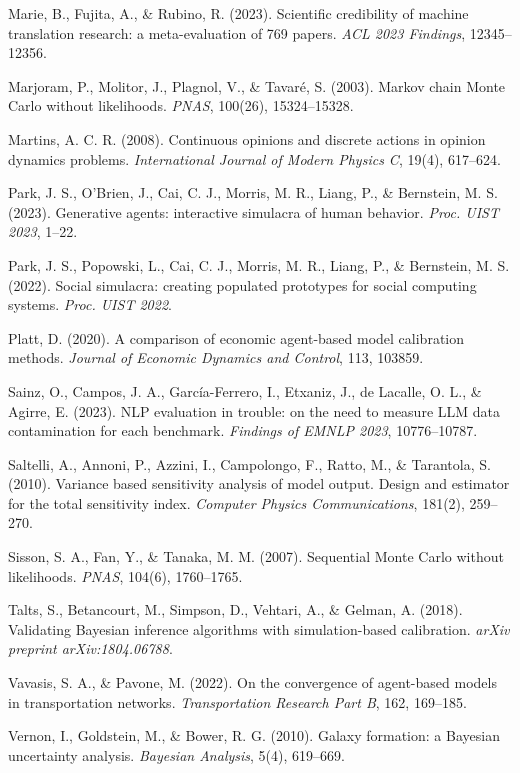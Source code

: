 \documentclass[
]{article}
\begin{document}
Marie, B., Fujita, A., \& Rubino, R. (2023). Scientific credibility of
machine translation research: a meta-evaluation of 769 papers. \emph{ACL
2023 Findings}, 12345--12356.

Marjoram, P., Molitor, J., Plagnol, V., \& Tavaré, S. (2003). Markov
chain Monte Carlo without likelihoods. \emph{PNAS}, 100(26),
15324--15328.

Martins, A. C. R. (2008). Continuous opinions and discrete actions in
opinion dynamics problems. \emph{International Journal of Modern Physics
C}, 19(4), 617--624.

Park, J. S., O'Brien, J., Cai, C. J., Morris, M. R., Liang, P., \&
Bernstein, M. S. (2023). Generative agents: interactive simulacra of
human behavior. \emph{Proc. UIST 2023}, 1--22.

Park, J. S., Popowski, L., Cai, C. J., Morris, M. R., Liang, P., \&
Bernstein, M. S. (2022). Social simulacra: creating populated prototypes
for social computing systems. \emph{Proc. UIST 2022}.

Platt, D. (2020). A comparison of economic agent-based model calibration
methods. \emph{Journal of Economic Dynamics and Control}, 113, 103859.

Sainz, O., Campos, J. A., García-Ferrero, I., Etxaniz, J., de Lacalle,
O. L., \& Agirre, E. (2023). NLP evaluation in trouble: on the need to
measure LLM data contamination for each benchmark. \emph{Findings of
EMNLP 2023}, 10776--10787.

Saltelli, A., Annoni, P., Azzini, I., Campolongo, F., Ratto, M., \&
Tarantola, S. (2010). Variance based sensitivity analysis of model
output. Design and estimator for the total sensitivity index.
\emph{Computer Physics Communications}, 181(2), 259--270.

Sisson, S. A., Fan, Y., \& Tanaka, M. M. (2007). Sequential Monte Carlo
without likelihoods. \emph{PNAS}, 104(6), 1760--1765.

Talts, S., Betancourt, M., Simpson, D., Vehtari, A., \& Gelman, A.
(2018). Validating Bayesian inference algorithms with simulation-based
calibration. \emph{arXiv preprint arXiv:1804.06788}.

Vavasis, S. A., \& Pavone, M. (2022). On the convergence of agent-based
models in transportation networks. \emph{Transportation Research Part
B}, 162, 169--185.

Vernon, I., Goldstein, M., \& Bower, R. G. (2010). Galaxy formation: a
Bayesian uncertainty analysis. \emph{Bayesian Analysis}, 5(4), 619--669.
\end{document}
